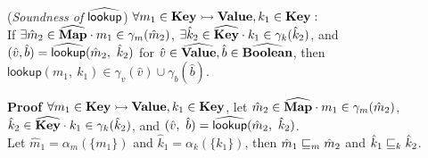 \begin{thm} \normalfont
(\textit{Soundness of} $\widehat{\textsf{lookup}}$)
$\forall m_1 \in \textbf{Key} \rightarrowtail \textbf{Value}, k_1 \in \textbf{Key} :$\\
If $\exists \hat{m}_2 \in \widehat{\textbf{Map}} \cdot m_1 \in \gamma_m(\hat{m}_2)$,
$\exists \hat{k}_2 \in \widehat{\textbf{Key}} \cdot k_1 \in \gamma_k(\hat{k}_2)$,
and $(\hat{v}, \hat{b}) = \wsf{lookup}(\hat{m}_2,\ \hat{k}_2)$ 
for $\hat{v} \in \widehat{\textbf{Value}}, \hat{b} \in \widehat{\textbf{Boolean}}$,
then $\textsf{lookup}(m_1,\ k_1) \in \gamma_v(\hat{v}) \cup \gamma_b(\hat{b})$.
\end{thm}
\textbf{Proof } $\forall m_1 \in \textbf{Key} \rightarrowtail \textbf{Value}, k_1 \in \textbf{Key}$, 
let $\hat{m}_2 \in \widehat{\textbf{Map}} \cdot m_1 \in \gamma_m(\hat{m}_2)$,
$\hat{k}_2 \in \widehat{\textbf{Key}} \cdot k_1 \in \gamma_k(\hat{k}_2)$,
and $(\hat{v},\ \hat{b}) = \wsf{lookup}(\hat{m}_2,\ \hat{k}_2)$.\\
Let $\hat{m}_1 = \alpha_m(\{ m_1 \})$ and $\hat{k}_1 = \alpha_k(\{ k_1 \})$,
then $\hat{m}_1 \sqsubseteq_m \hat{m}_2$ and $\hat{k}_1 \sqsubseteq_k \hat{k}_2$.
